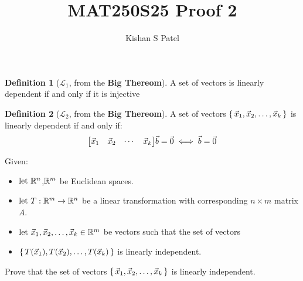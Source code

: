 \documentclass{exam}
\theoremstyle{plain}
\theoremstyle{definition}
\newtheorem{definition}{Definition}
\begin{document}
\title{MAT250S25 Proof 2}
\author{Kishan S Patel}
\maketitle

\begin{definition}[$\mathcal L_1$, from the \textbf{Big Thereom}\textsuperscript{\texttrademark}]
	A set of vectors is linearly dependent if and only if it is injective
\end{definition}

\begin{definition}[$\mathcal L_2$, from the \textbf{Big Thereom}\textsuperscript{\texttrademark}]
	A set of vectors $\set{\vec x_1, \vec x_2, \dots, \vec x_k}$ is linearly dependent if and only if:
	$$
		{ \begin{bmatrix} \vec x_1 & \vec x_2 & \cdots & \vec x_k \end{bmatrix} }\vec b  = \vec 0 \iff \vec b = \vec 0
	$$
\end{definition}

Given:
\begin{itemize}
	\item ${\text{let } } {\mathbb R}^n$,${\mathbb R}^m$ be Euclidean spaces.
	\item ${\text{let } } T:{\mathbb R}^m\to{\mathbb R}^ n$ be a linear transformation with corresponding $n\times m$ matrix $A$.
	\item ${\text{let } } \vec x_1, \vec x_2, \dots, \vec x_k \in {\mathbb R}^ m$ be vectors such that the set of vectors
	\item $\set{T(\vec x_1), T(\vec x_2), \dots, T(\vec x_k)}$ is linearly independent.
\end{itemize}

Prove that the set of vectors $\set{\vec x_1, \vec x_2, \dots, \vec x_k}$ is linearly independent.

\renewcommand\qedsymbol{QED}


\end{document}

